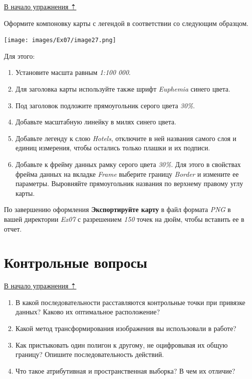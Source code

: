 \documentclass[12pt,]{book}
\begin{document}
\protect\hyperlink{map-ref-economic}{В начало упражнения ⇡}

Оформите компоновку карты с легендой в соответствии со следующим
образцом.

\texttt{[image: images/Ex07/image27.png]}

Для этого:

\begin{enumerate}
\def\labelenumi{\arabic{enumi}.}
\item
  Установите масшта равным \emph{1:100 000}.
\item
  Для заголовка карты используйте также шрифт \emph{Euphemia} синего цвета.
\item
  Под заголовок подложите прямоугольник серого цвета \emph{30\%}.
\item
  Добавьте масштабную линейку в милях синего цвета.
\item
  Добавьте легенду к слою \emph{Hotels}, отключите в ней названия самого слоя и единиц измерения, чтобы остались только плашки и их подписи.
\item
  Добавьте к фрейму данных рамку серого цвета \emph{30\%}. Для этого в свойствах фрейма данных на вкладке \emph{Frame} выберите границу \emph{Border} и измените ее параметры. Выровняйте прямоугольник названия по верхнему правому углу карты.
\end{enumerate}

По завершению оформления \textbf{Экспортируйте карту} в файл формата \emph{PNG} в вашей директории \emph{Ex07} с разрешением \emph{150} точек на дюйм, чтобы вставить ее в отчет.

\hypertarget{map-ref-economic-questions}{%
\section{Контрольные вопросы}\label{map-ref-economic-questions}}

\protect\hyperlink{map-ref-economic}{В начало упражнения ⇡}

\begin{enumerate}
\def\labelenumi{\arabic{enumi}.}
\item
  В какой последовательности расставляются контрольные точки при привязке данных? Каково их оптимальное расположение?
\item
  Какой метод трансформирования изображения вы использовали в работе?
\item
  Как пристыковать один полигон к другому, не оцифровывая их общую границу? Опишите последовательность действий.
\item
  Что такое атрибутивная и пространственная выборка? В чем их отличие?
\end{enumerate}
\end{document}
